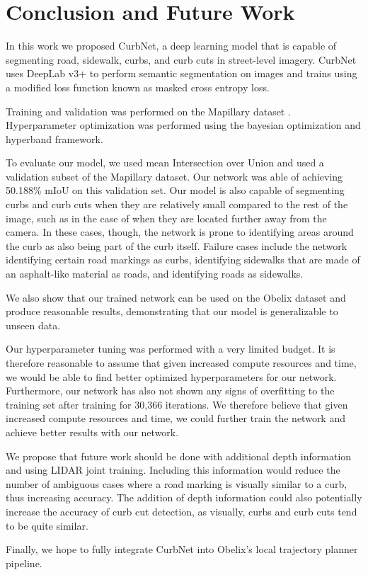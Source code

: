 \chapter{Conclusion and Future Work}\label{chap:conclusion}
In this work we proposed CurbNet, a deep learning model that is capable of segmenting road, sidewalk, curbs, and curb cuts in street-level imagery.
CurbNet uses DeepLab v3+ to perform semantic segmentation on images and trains using a modified loss function known as masked cross entropy loss.

Training and validation was performed on the Mapillary dataset \cite{mapillary}.
Hyperparameter optimization was performed using the bayesian optimization and hyperband framework.

To evaluate our model, we used mean Intersection over Union and used a validation subset of the Mapillary dataset.
Our network was able of achieving 50.188\% mIoU on this validation set.
Our model is also capable of segmenting curbs and curb cuts when they are relatively small compared to the rest of the image, such as in the case of when they are located further away from the camera.
In these cases, though, the network is prone to identifying areas around the curb as also being part of the curb itself.
Failure cases include the network identifying certain road markings as curbs, identifying sidewalks that are made of an asphalt-like material as roads, and identifying roads as sidewalks.

We also show that our trained network can be used on the Obelix dataset and produce reasonable results, demonstrating that our model is generalizable to unseen data.

Our hyperparameter tuning was performed with a very limited budget.
It is therefore reasonable to assume that given increased compute resources and time, we would be able to find better optimized hyperparameters for our network.
Furthermore, our network has also not shown any signs of overfitting to the training set after training for 30,366 iterations.
We therefore believe that given increased compute resources and time, we could further train the network and achieve better results with our network.

We propose that future work should be done with additional depth information and using LIDAR joint training.
Including this information would reduce the number of ambiguous cases where a road marking is visually similar to a curb, thus increasing accuracy.
The addition of depth information could also potentially increase the accuracy of curb cut detection, as visually, curbs and curb cuts tend to be quite similar.

Finally, we hope to fully integrate CurbNet into Obelix's local trajectory planner pipeline.